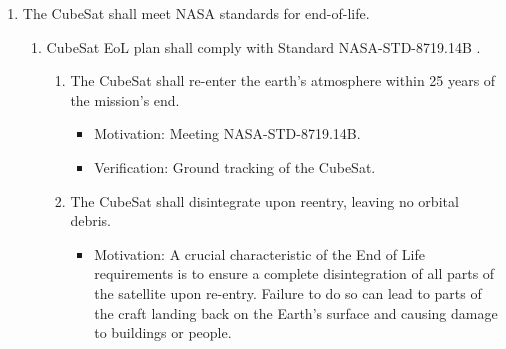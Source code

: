 \begin{enumerate}
\begin{enumerate}
\begin{enumerate}
                \begin{itemize}
                    \item Motivation: Orientation with the magnetic field is required by scientific payload and pointing accuracy gives margin of error from current state-of-the-art GNC systems which can produce point accuracy of better than 0.2° 
                    \item Verification: Engaging GNC system in vacuum chamber test facility. 
                \end{itemize}
            \item The CubeSat shall be able to receive information from the ground station at a minimum rate of 2 kb/s.
                \begin{itemize}
                    \item Motivation: Ability to send commands to the satellite allows for versatile passivation systems, and allows for corrections to be made to systems during mission phase. 
                    \item Verification: Communications system activated and data packet sent to the satellite, with pre-programmed response returned from the satellite upon completion.   
                \end{itemize}
        \end{enumerate}
    \end{enumerate} %
    \item The CubeSat shall meet NASA standards for end-of-life.
    \begin{enumerate}
        \item CubeSat EoL plan shall comply with Standard NASA-STD-8719.14B \cite{STD8719}. 
        \begin{enumerate}
            \item The CubeSat shall re-enter the earth’s atmosphere within 25 years of the mission's end. 
               \begin{itemize}
                    \item Motivation: Meeting NASA-STD-8719.14B.
                    \item Verification: Ground tracking of the CubeSat.
                \end{itemize}
            \item The CubeSat shall disintegrate upon reentry, leaving no orbital debris. 
                \begin{itemize}
                    \item Motivation: A crucial characteristic of the End of Life requirements is to ensure a complete disintegration of all parts of the satellite upon re-entry. Failure to do so can lead to parts of the craft landing back on the Earth’s surface and causing damage to buildings or people.

\end{itemize}
\end{enumerate}
\end{enumerate}
\end{enumerate}
